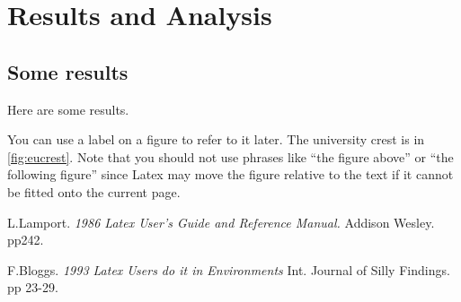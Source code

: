 \documentclass[12pt,a4paper]{article}
\begin{document}
\newpage
{}

\section{Results and Analysis}

\subsection{Some results}
Here are some results.

You can use a label on a figure to refer to it later. The university
crest is in \ref{fig:eucrest}. Note that you should not use phrases like
``the figure above'' or ``the following figure'' since Latex may move
the figure relative to the text if it cannot be fitted onto the current page.

\begin{thebibliography}{100}

 L.Lamport. {\em 1986 Latex User's Guide
and Reference Manual.} Addison Wesley. pp242.

 F.Bloggs. {\em 1993 Latex Users do it
in Environments} Int. Journal of Silly Findings. pp 23-29.

\end{thebibliography}
\end{document}

